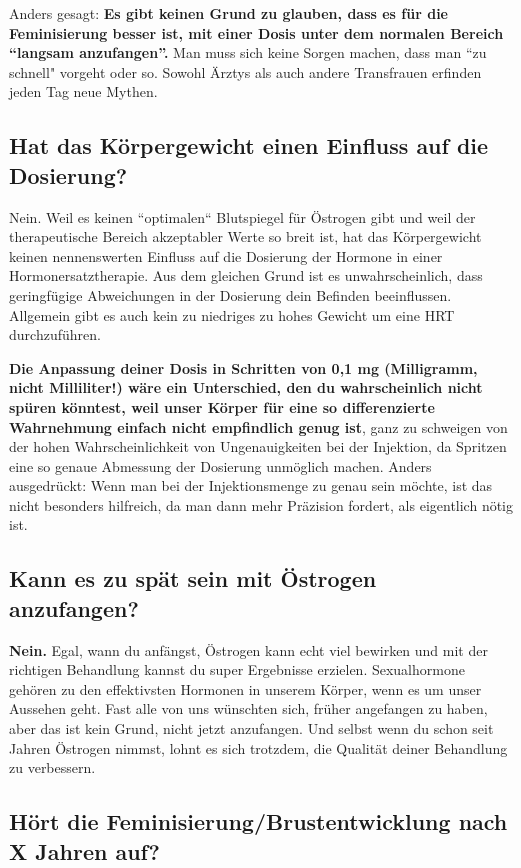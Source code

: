 \documentclass{article}
\begin{document}
Anders gesagt: \textbf{Es gibt keinen Grund zu glauben, dass es für die Feminisierung besser ist, mit einer Dosis unter dem normalen Bereich “langsam anzufangen”.} Man muss sich keine Sorgen machen, dass man “zu schnell" vorgeht oder so. Sowohl Ärztys als auch andere Transfrauen erfinden jeden Tag neue Mythen.

\subsection{Hat das Körpergewicht einen Einfluss auf die Dosierung?}

Nein. Weil es keinen “optimalen“ Blutspiegel für Östrogen gibt und weil der therapeutische Bereich akzeptabler Werte so breit ist, hat das Körpergewicht keinen nennenswerten Einfluss auf die Dosierung der Hormone in einer Hormonersatztherapie. Aus dem gleichen Grund ist es unwahrscheinlich, dass geringfügige Abweichungen in der Dosierung dein Befinden beeinflussen. Allgemein gibt es auch kein zu niedriges zu hohes Gewicht um eine HRT durchzuführen.

\textbf{Die Anpassung deiner Dosis in Schritten von 0,1 mg (Milligramm, nicht Milliliter!) wäre ein Unterschied, den du wahrscheinlich nicht spüren könntest, weil unser Körper für eine so differenzierte Wahrnehmung einfach nicht empfindlich genug ist}, ganz zu schweigen von der hohen Wahrscheinlichkeit von Ungenauigkeiten bei der Injektion, da Spritzen eine so genaue Abmessung der Dosierung unmöglich machen. Anders ausgedrückt: Wenn man bei der Injektionsmenge zu genau sein möchte, ist das nicht besonders hilfreich, da man dann mehr Präzision fordert, als eigentlich nötig ist.  

\subsection{Kann es zu spät sein mit Östrogen anzufangen?}\label{11-5}

\textbf{Nein.} Egal, wann du anfängst, Östrogen kann echt viel bewirken und mit der richtigen Behandlung kannst du super Ergebnisse erzielen. Sexualhormone gehören zu den effektivsten Hormonen in unserem Körper, wenn es um unser Aussehen geht. Fast alle von uns wünschten sich, früher angefangen zu haben, aber das ist kein Grund, nicht jetzt anzufangen. Und selbst wenn du schon seit Jahren Östrogen nimmst, lohnt es sich trotzdem, die Qualität deiner Behandlung zu verbessern.

\subsection{Hört die Feminisierung/Brustentwicklung nach X Jahren auf?}\label{11-6}
\end{document}
